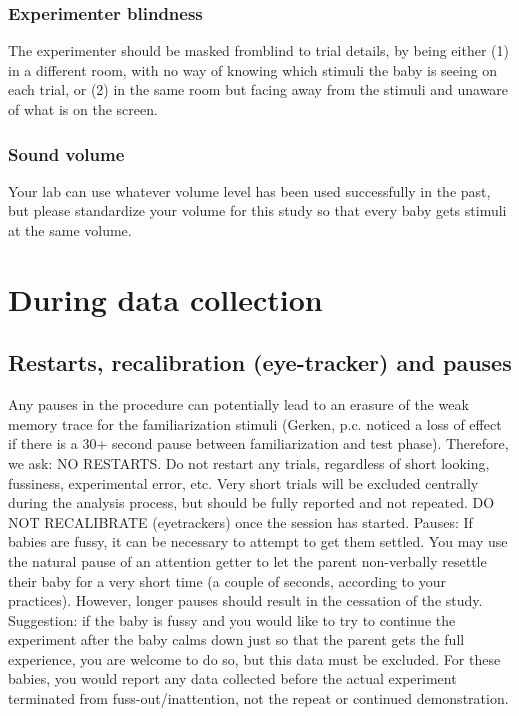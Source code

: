 \documentclass[
  letterpaper,
  DIV=11,
  numbers=noendperiod,
  oneside]{scrreprt}
\begin{document}
\subsection{Experimenter blindness}\label{experimenter-blindness}

The experimenter should be masked fromblind to trial details, by being
either (1) in a different room, with no way of knowing which stimuli the
baby is seeing on each trial, or (2) in the same room but facing away
from the stimuli and unaware of what is on the screen.

\subsection{Sound volume}\label{sound-volume}

Your lab can use whatever volume level has been used successfully in the
past, but please standardize your volume for this study so that every
baby gets stimuli at the same volume.

\chapter{During data collection}\label{sec-duringcollection}

\section{Restarts, recalibration (eye-tracker) and
pauses}\label{restarts-recalibration-eye-tracker-and-pauses}

Any pauses in the procedure can potentially lead to an erasure of the
weak memory trace for the familiarization stimuli (Gerken, p.c. noticed
a loss of effect if there is a 30+ second pause between familiarization
and test phase). Therefore, we ask: NO RESTARTS. Do not restart any
trials, regardless of short looking, fussiness, experimental error, etc.
Very short trials will be excluded centrally during the analysis
process, but should be fully reported and not repeated. DO NOT
RECALIBRATE (eyetrackers) once the session has started. Pauses: If
babies are fussy, it can be necessary to attempt to get them settled.
You may use the natural pause of an attention getter to let the parent
non-verbally resettle their baby for a very short time (a couple of
seconds, according to your practices). However, longer pauses should
result in the cessation of the study. Suggestion: if the baby is fussy
and you would like to try to continue the experiment after the baby
calms down just so that the parent gets the full experience, you are
welcome to do so, but this data must be excluded. For these babies, you
would report any data collected before the actual experiment terminated
from fuss-out/inattention, not the repeat or continued demonstration.
\end{document}
